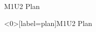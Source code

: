 \begin{frame}{M1U2 Plan}
	\tableofcontents
\end{frame}
%
%
\begin{frame}<0>[label=plan]{M1U2 Plan}
	\tableofcontents[currentsection]
\end{frame}